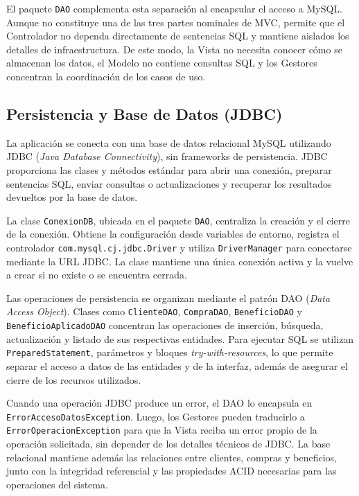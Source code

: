 \documentclass{article}
\begin{document}
El paquete \texttt{DAO} complementa esta separación al encapsular el acceso a MySQL. Aunque no constituye una de las tres partes nominales de MVC, permite que el Controlador no dependa directamente de sentencias SQL y mantiene aislados los detalles de infraestructura. De este modo, la Vista no necesita conocer cómo se almacenan los datos, el Modelo no contiene consultas SQL y los Gestores concentran la coordinación de los casos de uso.

\subsection{Persistencia y Base de Datos (JDBC)}
La aplicación se conecta con una base de datos relacional MySQL utilizando JDBC (\textit{Java Database Connectivity}), sin frameworks de persistencia. JDBC proporciona las clases y métodos estándar para abrir una conexión, preparar sentencias SQL, enviar consultas o actualizaciones y recuperar los resultados devueltos por la base de datos.

La clase \texttt{ConexionDB}, ubicada en el paquete \texttt{DAO}, centraliza la creación y el cierre de la conexión. Obtiene la configuración desde variables de entorno, registra el controlador \texttt{com.mysql.cj.jdbc.Driver} y utiliza \texttt{DriverManager} para conectarse mediante la URL JDBC. La clase mantiene una única conexión activa y la vuelve a crear si no existe o se encuentra cerrada.

Las operaciones de persistencia se organizan mediante el patrón DAO (\textit{Data Access Object}). Clases como \texttt{ClienteDAO}, \texttt{CompraDAO}, \texttt{BeneficioDAO} y \texttt{BeneficioAplicadoDAO} concentran las operaciones de inserción, búsqueda, actualización y listado de sus respectivas entidades. Para ejecutar SQL se utilizan \texttt{PreparedStatement}, parámetros y bloques \textit{try-with-resources}, lo que permite separar el acceso a datos de las entidades y de la interfaz, además de asegurar el cierre de los recursos utilizados.

Cuando una operación JDBC produce un error, el DAO lo encapsula en \texttt{ErrorAccesoDatosException}. Luego, los Gestores pueden traducirlo a \texttt{ErrorOperacionException} para que la Vista reciba un error propio de la operación solicitada, sin depender de los detalles técnicos de JDBC. La base relacional mantiene además las relaciones entre clientes, compras y beneficios, junto con la integridad referencial y las propiedades ACID necesarias para las operaciones del sistema.
\end{document}
